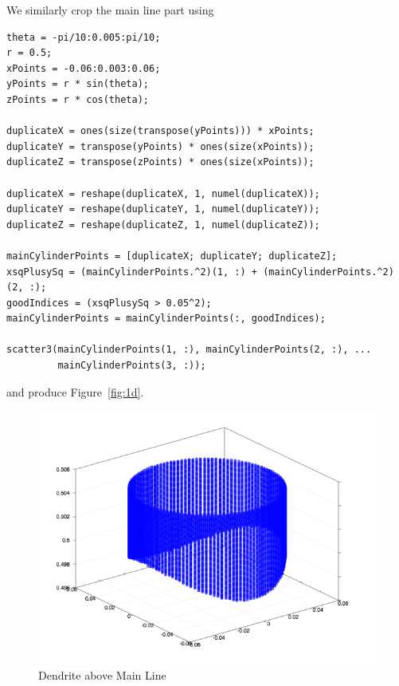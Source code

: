 \documentclass[a4paper,10pt]{article}
\begin{document}
We similarly crop the main line part using
\begin{verbatim}
theta = -pi/10:0.005:pi/10;
r = 0.5;
xPoints = -0.06:0.003:0.06;
yPoints = r * sin(theta);
zPoints = r * cos(theta);

duplicateX = ones(size(transpose(yPoints))) * xPoints;
duplicateY = transpose(yPoints) * ones(size(xPoints));
duplicateZ = transpose(zPoints) * ones(size(xPoints));

duplicateX = reshape(duplicateX, 1, numel(duplicateX));
duplicateY = reshape(duplicateY, 1, numel(duplicateY));
duplicateZ = reshape(duplicateZ, 1, numel(duplicateZ));

mainCylinderPoints = [duplicateX; duplicateY; duplicateZ];
xsqPlusySq = (mainCylinderPoints.^2)(1, :) + (mainCylinderPoints.^2)(2, :);
goodIndices = (xsqPlusySq > 0.05^2);
mainCylinderPoints = mainCylinderPoints(:, goodIndices);

scatter3(mainCylinderPoints(1, :), mainCylinderPoints(2, :), ...
         mainCylinderPoints(3, :));
\end{verbatim}
and produce Figure~\ref{fig:1d}.

\begin{figure}
  \centering
    \includegraphics[scale=0.5]{top_part_dendrite.png}
  \caption{Dendrite above Main Line}
  \label{fig:1c}
\end{figure}
\end{document}
